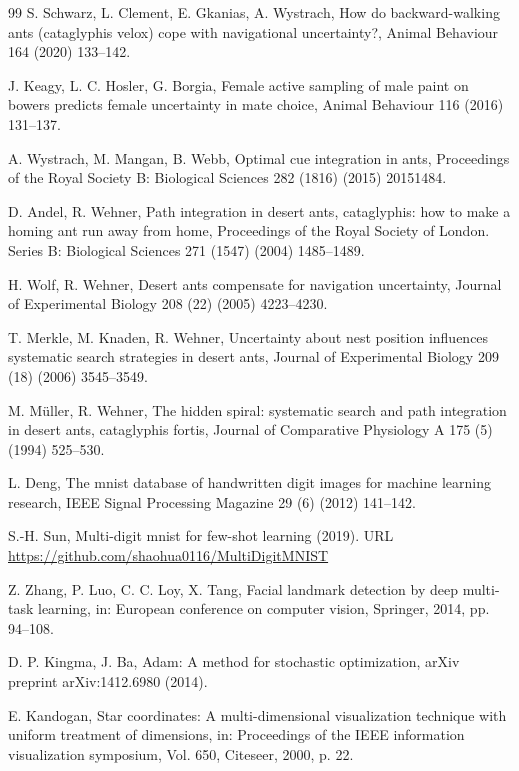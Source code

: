\documentclass[12pt,a4paper]{article}
\begin{document}
\begin{thebibliography}{99}
		S. Schwarz, L. Clement, E. Gkanias, A. Wystrach, How do backward-walking ants (cataglyphis velox) cope with navigational uncertainty?, Animal Behaviour 164 (2020) 133--142.
		
		J. Keagy, L. C. Hosler, G. Borgia, Female active sampling of male paint on bowers predicts female uncertainty in mate choice, Animal Behaviour 116 (2016) 131--137.
		
		A. Wystrach, M. Mangan, B. Webb, Optimal cue integration in ants, Proceedings of the Royal Society B: Biological Sciences 282 (1816) (2015) 20151484.
		
		D. Andel, R. Wehner, Path integration in desert ants, cataglyphis: how to make a homing ant run away from home, Proceedings of the Royal Society of London. Series B: Biological Sciences 271 (1547) (2004) 1485--1489.
		
		H. Wolf, R. Wehner, Desert ants compensate for navigation uncertainty, Journal of Experimental Biology 208 (22) (2005) 4223--4230.
		
		T. Merkle, M. Knaden, R. Wehner, Uncertainty about nest position influences systematic search strategies in desert ants, Journal of Experimental Biology 209 (18) (2006) 3545--3549.
		
		M. Müller, R. Wehner, The hidden spiral: systematic search and path integration in desert ants, cataglyphis fortis, Journal of Comparative Physiology A 175 (5) (1994) 525--530.
		
		L. Deng, The mnist database of handwritten digit images for machine learning research, IEEE Signal Processing Magazine 29 (6) (2012) 141--142.
		
		S.-H. Sun, Multi-digit mnist for few-shot learning (2019).
		URL \url{https://github.com/shaohua0116/MultiDigitMNIST}
		
		Z. Zhang, P. Luo, C. C. Loy, X. Tang, Facial landmark detection by deep multi-task learning, in: European conference on computer vision, Springer, 2014, pp. 94--108.
		
		D. P. Kingma, J. Ba, Adam: A method for stochastic optimization, arXiv preprint arXiv:1412.6980 (2014).
		
		E. Kandogan, Star coordinates: A multi-dimensional visualization technique with uniform treatment of dimensions, in: Proceedings of the IEEE information visualization symposium, Vol. 650, Citeseer, 2000, p. 22.
		
	\end{thebibliography}
	
\end{document}
